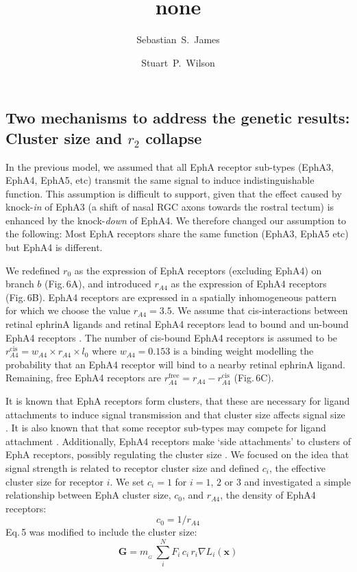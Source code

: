 \documentclass[9pt]{elife} %
\title {none}
\author[1]{Sebastian~S.~James}
\author[1*]{Stuart~P.~Wilson}
\affil[1]{Department of Psychology, The University of Sheffield, Sheffield, United Kingdom.}
\begin{document}
\subsection*{Two mechanisms to address the genetic results: Cluster size and $r_2$ collapse}

In the previous model, we assumed that all EphA receptor sub-types (EphA3, EphA4, EphA5, etc) transmit the same signal to induce indistinguishable function.
This assumption is difficult to support, given that the effect caused by knock-\emph{in} of EphA3 (a shift of nasal RGC axons towards the rostral tectum) is enhanced by the knock-\emph{down} of EphA4.
We therefore changed our assumption to the following: Most EphA receptors
share the same function (EphA3, EphA5 etc) but EphA4 is different.

We redefined $r_{\!\scriptscriptstyle 0}$ as the expression of EphA receptors (excluding EphA4) on branch $b$ (Fig.\,6A), and introduced $r_{\!\scriptscriptstyle A4}$ as the expression of EphA4 receptors (Fig.\,6B). EphA4 receptors are expressed in a spatially inhomogeneous pattern~\citep{reber_relative_2004} for which we choose the value $r_{\!\scriptscriptstyle A4} = 3.5$.  We assume that cis-interactions between retinal ephrinA ligands and retinal EphA4 receptors lead to bound and un-bound EphA4 receptors \citep{hornberger_modulation_1999}. The number of cis-bound EphA4 receptors is assumed to be $r_{\!\scriptscriptstyle A4}^{\mathrm{cis}} = w_{\!\scriptscriptstyle A4} \times r_{\!\scriptscriptstyle A4} \times l_0$ where $w_{\!\scriptscriptstyle A4} = 0.153$ is a binding weight modelling the probability that an EphA4 receptor will bind to a nearby retinal ephrinA ligand. Remaining, free EphA4 receptors are $r_{\!\scriptscriptstyle A4}^{\mathrm{free}} = r_{\!\scriptscriptstyle A4} - r_{\!\scriptscriptstyle A4}^{\mathrm{cis}}$ (Fig.\,6C).

It is known that EphA receptors form clusters, that these are necessary for ligand attachments to induce signal transmission and that cluster size affects signal size \citep{nikolov_ephephrin_2013}. It is also known that that some receptor sub-types may compete for ligand attachment \citep{fiore_regulation_2019}.
Additionally, EphA4 receptors make `side attachments' to clusters of EphA receptors, possibly regulating the cluster size \citep{nikolov_ephephrin_2013}.
%
We focused on the idea that signal strength is related to receptor cluster size and defined $c_i$, the effective cluster size for receptor $i$.
We set $c_i=1$ for $i=1$, $2$ or $3$ and investigated a simple relationship between EphA cluster size, $c_0$, and $r_{\!\scriptscriptstyle A4}$, the density of EphA4 receptors:
\begin{equation}
    c_0 = 1/r_{\!\scriptscriptstyle A4}
\end{equation}
%
Eq.\,5 was modified to include the cluster size:
%
\begin{equation}\label{e:Gcs}
\mathbf{G} = m_{\!_G}\,\sum_i^N F_i\,c_i\,r_{i} \nabla L_i(\mathbf{x})
\end{equation}
\end{document}
